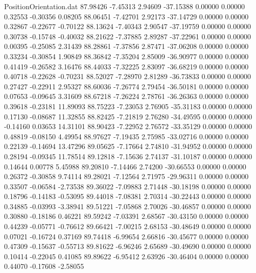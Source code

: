 \begin{filecontents}{PositionOrientation.dat}
  87.98426   -7.45313    2.94609   -37.15388    0.00000    0.00000    0.32553   -0.30356    0.08205
  88.06451   -7.42701    2.92173   -37.14729    0.00000    0.00000    0.32867   -0.22677   -0.70122
  88.13624   -7.40343    2.90547   -37.19759    0.00000    0.00000    0.30738   -0.15748   -0.40032
  88.21622   -7.37885    2.89287   -37.22961    0.00000    0.00000    0.00395   -0.25085    2.31439
  88.28861   -7.37856    2.87471   -37.06208    0.00000    0.00000    0.33234   -0.30854    1.90849
  88.36842   -7.35204    2.85009   -36.90977    0.00000    0.00000    0.41419   -0.26582    3.16476
  88.44033   -7.32225    2.83097   -36.68219    0.00000    0.00000    0.40718   -0.22628   -0.70231
  88.52027   -7.28970    2.81289   -36.73833    0.00000    0.00000    0.27427   -0.22911    2.95327
  88.60036   -7.26774    2.79454   -36.50181    0.00000    0.00000    0.07653   -0.09645    3.31609
  88.67218   -7.26224    2.78761   -36.26363    0.00000    0.00000    0.39618   -0.23181   11.89093
  88.75223   -7.23053    2.76905   -35.31183    0.00000    0.00000    0.17130   -0.08687   11.32855
  88.82425   -7.21819    2.76280   -34.49595    0.00000    0.00000   -0.14160    0.03653   14.31101
  88.90423   -7.22952    2.76572   -33.35129    0.00000    0.00000    0.48819   -0.08150    4.49954
  88.97627   -7.19435    2.75985   -33.02716    0.00000    0.00000    0.22139   -0.14694   13.47296
  89.05625   -7.17664    2.74810   -31.94952    0.00000    0.00000    0.28194   -0.09345   11.78514
  89.12818   -7.15636    2.74137   -31.10187    0.00000    0.00000    0.14644    0.00778    5.45988
  89.20810   -7.14466    2.74200   -30.66553    0.00000    0.00000    0.26372   -0.30858    9.74114
  89.28021   -7.12564    2.71975   -29.96311    0.00000    0.00000    0.33507   -0.06584   -2.73538
  89.36022   -7.09883    2.71448   -30.18198    0.00000    0.00000    0.18796   -0.14183   -0.53095
  89.44018   -7.08381    2.70314   -30.22443    0.00000    0.00000    0.34885   -0.03993   -3.38941
  89.51221   -7.05868    2.70026   -30.46857    0.00000    0.00000    0.30880   -0.18186    0.46221
  89.59242   -7.03391    2.68567   -30.43150    0.00000    0.00000    0.44239   -0.05771   -0.76612
  89.66421   -7.00215    2.68153   -30.48649    0.00000    0.00000    0.07021   -0.16724    0.37169
  89.74418   -6.99654    2.66816   -30.45677    0.00000    0.00000    0.47309   -0.15637   -0.55713
  89.81622   -6.96246    2.65689   -30.49690    0.00000    0.00000    0.10414   -0.22045    0.41085
  89.89622   -6.95412    2.63926   -30.46404    0.00000    0.00000    0.44070   -0.17608   -2.58055

\end{filecontents}
